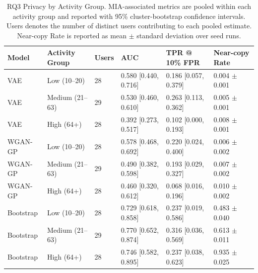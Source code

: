 \begin{table}[ht]
\centering
\begin{tabular}{llllll}
\toprule
Model & Activity Group & Users & AUC & TPR @ 10\% FPR & Near-copy Rate \\
\midrule
VAE & Low (10--20) & 28 & 0.580 [0.440, 0.716] & 0.186 [0.057, 0.379] & 0.004 $\pm$ 0.001 \\
VAE & Medium (21--63) & 29 & 0.530 [0.460, 0.610] & 0.263 [0.113, 0.362] & 0.005 $\pm$ 0.001 \\
VAE & High (64+) & 28 & 0.392 [0.273, 0.517] & 0.102 [0.000, 0.193] & 0.008 $\pm$ 0.001 \\
WGAN-GP & Low (10--20) & 28 & 0.578 [0.468, 0.692] & 0.220 [0.024, 0.400] & 0.006 $\pm$ 0.002 \\
WGAN-GP & Medium (21--63) & 29 & 0.490 [0.382, 0.598] & 0.193 [0.029, 0.327] & 0.007 $\pm$ 0.002 \\
WGAN-GP & High (64+) & 28 & 0.460 [0.320, 0.612] & 0.068 [0.016, 0.196] & 0.010 $\pm$ 0.002 \\
Bootstrap & Low (10--20) & 28 & 0.729 [0.618, 0.858] & 0.237 [0.019, 0.586] & 0.483 $\pm$ 0.040 \\
Bootstrap & Medium (21--63) & 29 & 0.770 [0.652, 0.874] & 0.316 [0.036, 0.569] & 0.613 $\pm$ 0.011 \\
Bootstrap & High (64+) & 28 & 0.746 [0.582, 0.895] & 0.237 [0.038, 0.623] & 0.935 $\pm$ 0.025 \\
\bottomrule
\end{tabular}
\caption{RQ3 Privacy by Activity Group. MIA-associated metrics are pooled within each activity group and reported with 95\% cluster-bootstrap confidence intervals. Users denotes the number of distinct users contributing to each pooled estimate. Near-copy Rate is reported as mean $\pm$ standard deviation over seed runs.}
\label{tab:rq3_by_activity}
\end{table}
